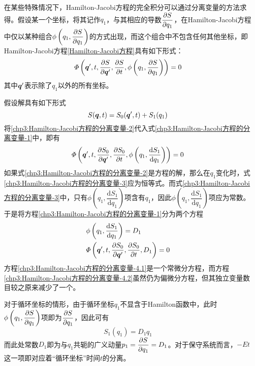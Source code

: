 在某些特殊情况下，Hamilton-Jacobi方程的完全积分可以通过分离变量的方法求得。假设某一个坐标，将其记作$q_1$，与其相应的导数$\dfrac{\partial S}{\partial q_1}$，在Hamilton-Jacobi方程中仅以某种组合$\phi\left(q_1,\dfrac{\partial S}{\partial q_1}\right)$的方式出现，而这个组合中不包含任何其他坐标，即Hamilton-Jacobi方程\eqref{Hamilton-Jacobi方程}具有如下形式：
\begin{equation}
	\varPhi\left(\boldsymbol{q}',t,\frac{\partial S}{\partial \boldsymbol{q}'},\frac{\partial S}{\partial t},\phi\left(q_1,\dfrac{\partial S}{\partial q_1}\right)\right) = 0
	\label{chp3:Hamilton-Jacobi方程的分离变量-1}
\end{equation}
其中$\boldsymbol{q}'$表示除了$q_1$以外的所有坐标。

假设解具有如下形式
\begin{equation}
	S(\boldsymbol{q},t) = S_0(\boldsymbol{q}',t)+S_1(q_1)
	\label{chp3:Hamilton-Jacobi方程的分离变量-2}
\end{equation}
将\eqref{chp3:Hamilton-Jacobi方程的分离变量-2}代入式\eqref{chp3:Hamilton-Jacobi方程的分离变量-1}中，即有
\begin{equation}
	\varPhi\left(\boldsymbol{q}',t,\frac{\partial S_0}{\partial \boldsymbol{q}'},\frac{\partial S_0}{\partial t},\phi\left(q_1,\dfrac{\mathrm{d} S_1}{\mathrm{d} q_1}\right)\right) = 0
	\label{chp3:Hamilton-Jacobi方程的分离变量-3}
\end{equation}
如果式\eqref{chp3:Hamilton-Jacobi方程的分离变量-2}是方程的解，那么在$q_1$变化时，式\eqref{chp3:Hamilton-Jacobi方程的分离变量-3}应为恒等式。而式\eqref{chp3:Hamilton-Jacobi方程的分离变量-3}中，只有$\phi\left(q_1,\dfrac{\mathrm{d} S_1}{\mathrm{d} q_1}\right)$项含有$q_1$，因此$\phi\left(q_1,\dfrac{\mathrm{d} S_1}{\mathrm{d} q_1}\right)$项应为常数。于是将方程\eqref{chp3:Hamilton-Jacobi方程的分离变量-1}分为两个方程
\begin{align}
	& \phi\left(q_1,\dfrac{\mathrm{d} S_1}{\mathrm{d} q_1}\right) = D_1 \label{chp3:Hamilton-Jacobi方程的分离变量-4.1} \\
	& \varPhi\left(\boldsymbol{q}',t,\frac{\partial S_0}{\partial \boldsymbol{q}'},\frac{\partial S_0}{\partial t},D_1\right) = 0 \label{chp3:Hamilton-Jacobi方程的分离变量-4.2}
\end{align}
方程\eqref{chp3:Hamilton-Jacobi方程的分离变量-4.1}是一个常微分方程，而方程\eqref{chp3:Hamilton-Jacobi方程的分离变量-4.2}虽然仍为偏微分方程，但其独立变量数目较之原来减少了一个。

对于循环坐标的情形，由于循环坐标$q_1$不显含于Hamilton函数中，此时$\phi\left(q_1,\dfrac{\partial S}{\partial q_1}\right)$项即为$\dfrac{\partial S}{\partial q_1}$，因此可有
\begin{equation*}
	S_1(q_1) = D_1q_1
\end{equation*}
而此处常数$D_1$即为与$q_1$共轭的广义动量$p_1=\dfrac{\partial S}{\partial q_1}=D_1$。对于保守系统而言，$-Et$这一项即对应着``循环坐标''时间$t$的分离。

